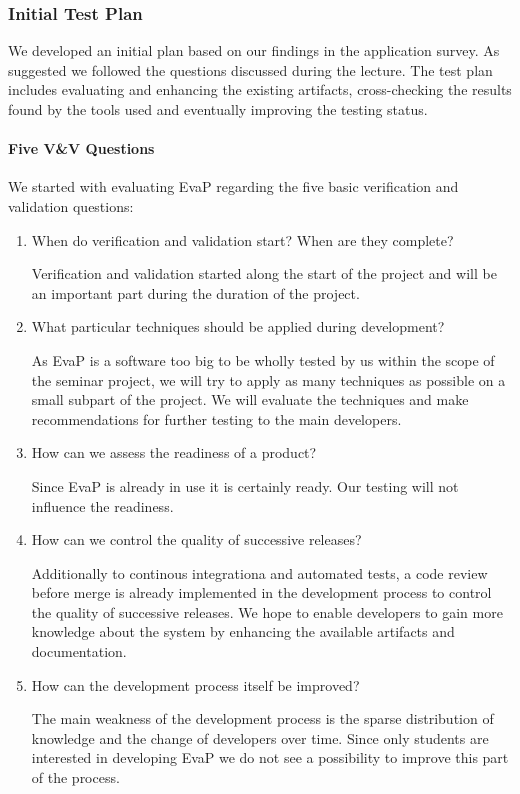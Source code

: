 \subsubsection{Initial Test Plan}
We developed an initial plan based on our findings in the application survey.
As suggested we followed the questions discussed during the lecture.
The test plan includes evaluating and enhancing the existing artifacts, cross-checking the results found by the tools used and eventually improving the testing status.

\paragraph{Five V\&V Questions}
We started with evaluating EvaP regarding the five basic verification and validation questions:
\begin{enumerate}
	\item When do verification and validation start? When are they complete?
    
    Verification and validation started along the start of the project and will be an important part during the duration of the project. 
	\item What particular techniques should be applied during development?
    
    As EvaP is a software too big to be wholly tested by us within the scope of the seminar project, we will try to apply as many techniques as possible on a small subpart of the project.
    We will evaluate the techniques and make recommendations for further testing to the main developers.
	\item How can we assess the readiness of a product?
    
    Since EvaP is already in use it is certainly ready. Our testing will not influence the readiness.
	\item How can we control the quality of successive releases?
    
    Additionally to continous integrationa and automated tests, a code review before merge is already implemented in the development process to control the quality of successive releases.
    We hope to enable developers to gain more knowledge about the system by enhancing the available artifacts and documentation.
	\item How can the development process itself be improved?
    
    The main weakness of the development process is the sparse distribution of knowledge and the change of developers over time.
    Since only students are interested in developing EvaP we do not see a possibility to improve this part of the process.
\end{enumerate}

